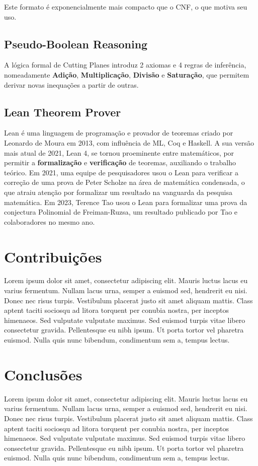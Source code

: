 \documentclass[conference]{IEEEtran}
\begin{document}
Este formato é exponencialmente mais compacto que o CNF, o que motiva seu uso\cite{PBSolve}.

\subsection{Pseudo-Boolean Reasoning}
A lógica formal de Cutting Planes introduz 2 axiomas e 4 regras de inferência, nomeadamente
\textbf{Adição}, \textbf{Multiplicação}, \textbf{Divisão} e \textbf{Saturação},
que permitem derivar novas inequações a partir de outras\cite{CutPlane}.

\subsection{Lean Theorem Prover}
Lean é uma linguagem de programação e provador de teoremas criado por Leonardo de Moura em 2013\cite{LeanProver}, com
influência de ML, Coq e Haskell.
A sua versão mais atual de 2021, Lean 4\cite{Lean4}, se tornou proeminente entre matemáticos, por permitir a
\textbf{formalização} e \textbf{verificação} de teoremas, auxiliando o trabalho teórico.
Em 2021, uma equipe de pesquisadores usou o Lean para verificar a correção de uma prova de Peter Scholze na área
de matemática condensada\cite{LTE}, o que atraiu atenção por formalizar um resultado na vanguarda da pesquisa matemática.
Em 2023, Terence Tao usou o Lean para formalizar uma prova da conjectura Polinomial de Freiman-Ruzsa\cite{PFR},
um resultado publicado por Tao e colaboradores no mesmo ano.

\section{Contribuições}
Lorem ipsum dolor sit amet, consectetur adipiscing elit. Mauris luctus lacus eu varius fermentum. Nullam lacus urna, semper a euismod sed, hendrerit eu nisi. Donec nec risus turpis. Vestibulum placerat justo sit amet aliquam mattis. Class aptent taciti sociosqu ad litora torquent per conubia nostra, per inceptos himenaeos. Sed vulputate vulputate maximus. Sed euismod turpis vitae libero consectetur gravida. Pellentesque eu nibh ipsum. Ut porta tortor vel pharetra euismod. Nulla quis nunc bibendum, condimentum sem a, tempus lectus.

\section*{Conclusões}
Lorem ipsum dolor sit amet, consectetur adipiscing elit. Mauris luctus lacus eu varius fermentum. Nullam lacus urna, semper a euismod sed, hendrerit eu nisi. Donec nec risus turpis. Vestibulum placerat justo sit amet aliquam mattis. Class aptent taciti sociosqu ad litora torquent per conubia nostra, per inceptos himenaeos. Sed vulputate vulputate maximus. Sed euismod turpis vitae libero consectetur gravida. Pellentesque eu nibh ipsum. Ut porta tortor vel pharetra euismod. Nulla quis nunc bibendum, condimentum sem a, tempus lectus.
\end{document}
